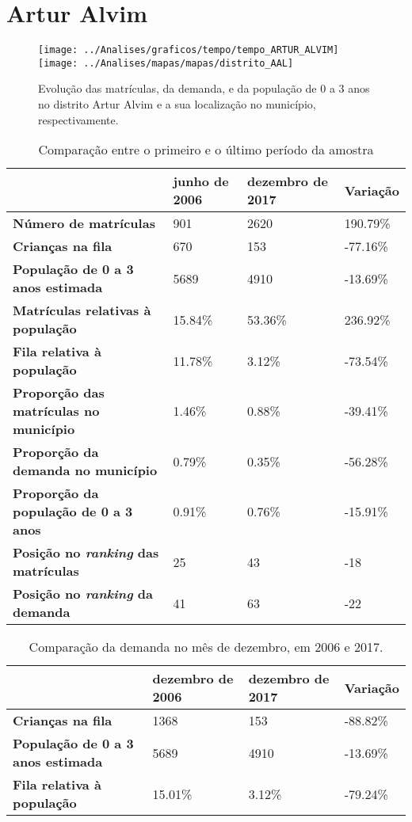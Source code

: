 \section{Artur Alvim}
\begin{figure}[H]
	\centering
	\texttt{[image: ../Analises/graficos/tempo/tempo\_ARTUR\_ALVIM]}
	\texttt{[image: ../Analises/mapas/mapas/distrito\_AAL]}
	\caption{Evolução das matrículas, da demanda, e da população de 0 a 3 anos no distrito Artur Alvim e a sua localização no município, respectivamente.}
\end{figure}
\begin{table}[H]
	\begin{tabular}{|l|l|l|l|}
		\hline
		\textbf{}                                      & \textbf{junho de 2006}       & \textbf{dezembro de 2017}    & \textbf{Variação} \\ \hline
		\textbf{Número de matrículas}                  & 901 & 2620 & 190.79\% \\ \hline
		\textbf{Crianças na fila}                      & 670 & 153 & -77.16\% \\ \hline
		\textbf{População de 0 a 3 anos estimada}      & 5689 & 4910 & -13.69\% \\ \hline
		\textbf{Matrículas relativas à população}      & 15.84\% & 53.36\% & 236.92\% \\ \hline
		\textbf{Fila relativa à população}             & 11.78\% & 3.12\% & -73.54\% \\ \hline
		\textbf{Proporção das matrículas no município} & 1.46\% & 0.88\% & -39.41\% \\ \hline
		\textbf{Proporção da demanda no município}     & 0.79\% & 0.35\% & -56.28\% \\ \hline
		\textbf{Proporção da população de 0 a 3 anos}  & 0.91\% & 0.76\% & -15.91\% \\ \hline
		\textbf{Posição no \textit{ranking} das matrículas}     & 25 & 43 & -18 \\ \hline
		\textbf{Posição no \textit{ranking} da demanda}         & 41 & 63 & -22 \\ \hline
	\end{tabular}
	\caption{Comparação entre o primeiro e o último período da amostra}
\end{table}
\begin{table}[H]
	\begin{tabular}{|l|l|l|l|}
		\hline
		\textbf{}                                 & \textbf{dezembro de 2006} & \textbf{dezembro de 2017} & \textbf{Variação} \\ \hline
		\textbf{Crianças na fila}                      & 1368 & 153 & -88.82\% \\ \hline
		\textbf{População de 0 a 3 anos estimada}      & 5689 & 4910 & -13.69\% \\ \hline
		\textbf{Fila relativa à população}             & 15.01\% & 3.12\% & -79.24\% \\ \hline
	\end{tabular}
	\caption{Comparação da demanda no mês de dezembro, em 2006 e 2017.}
\end{table}
